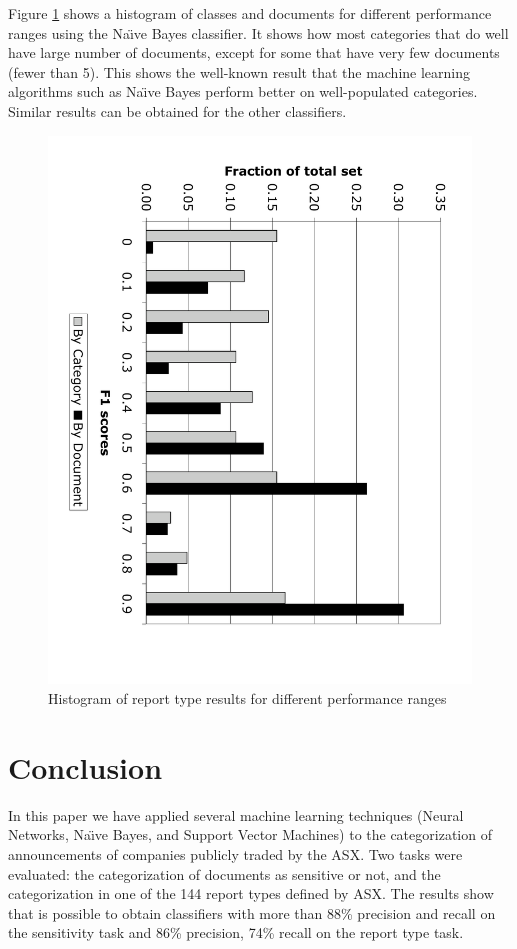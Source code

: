 \documentclass[twocolumn]{article}
\begin{document}
Figure \ref{histogram} shows a histogram of classes and documents for
different performance ranges using the Na\"\i ve Bayes classifier. It
shows how most categories that do well have large number of documents,
except for some that have very few documents (fewer than 5). This
shows the well-known result that the machine learning algorithms such
as Na\"\i ve Bayes perform better on well-populated
categories. Similar results can be obtained for the other classifiers.


\begin{figure}
\includegraphics[angle=90,width=\linewidth]{results}
\caption{Histogram of report type results for different performance ranges}
\label{histogram}
\end{figure}

\section{Conclusion}
\label{conclusion}


In this paper we have applied several machine learning techniques
(Neural Networks, Na\"\i ve Bayes, and Support Vector Machines) to the
categorization of announcements of companies publicly traded by the
ASX.  Two tasks were evaluated: the categorization of documents as
sensitive or not, and the categorization in one of the 144 report
types defined by ASX. The results show that is possible to obtain
classifiers with more than 88\% precision and recall on the
sensitivity task and 86\% precision, 74\% recall on the report type
task.
\end{document}
